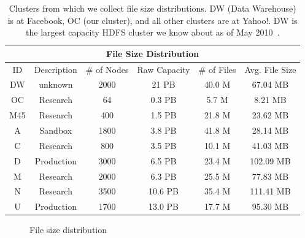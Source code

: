 
\begin{table}[tH]
  \centering
  \begin{tabular}[th]{|c|c|c|c|c|c|}
    \multicolumn{6}{c}{File Size Distribution}\\ 
    \hline
    ID & Description & \# of Nodes & Raw Capacity & \# of Files &
    Avg. File Size \\
    \hline
    \hline
    DW & unknown & 2000 & 21 PB & 40.0 M & 67.04 MB\\
    OC & Research& 64 & 0.3 PB & 5.7 M & 8.21 MB\\
    M45 & Research& 400 & 1.5 PB & 21.8 M & 23.62 MB\\
    A & Sandbox& 1800 & 3.8 PB & 41.8 M & 28.14 MB\\
    C & Research& 800 & 3.5 PB & 10.1 M & 41.03 MB\\
    D & Production& 3000 & 6.5 PB & 23.4 M & 102.09 MB\\
    M & Research& 2000 & 6.3 PB & 25.5 M & 77.83 MB\\
    N & Research& 3500 & 10.6 PB & 35.4 M & 111.41 MB\\
    U & Production& 1700 & 13.0 PB & 17.7 M & 95.30 MB\\
    \hline
  \end{tabular}
  \caption{Clusters from which we collect file size distributions. 
    DW (Data Warehouse) is at Facebook, OC (our cluster), and
    all other clusters are at Yahoo!. DW is  the largest capacity HDFS
  cluster we know about  as of May
  2010~\cite{facebook-datawarehouse}.}
  \label{tab:clusters}
\end{table}


\begin{figure}[t!h]
    \center
    \caption{File size distribution} 
    \label{fig:filedistr}
\end{figure}


